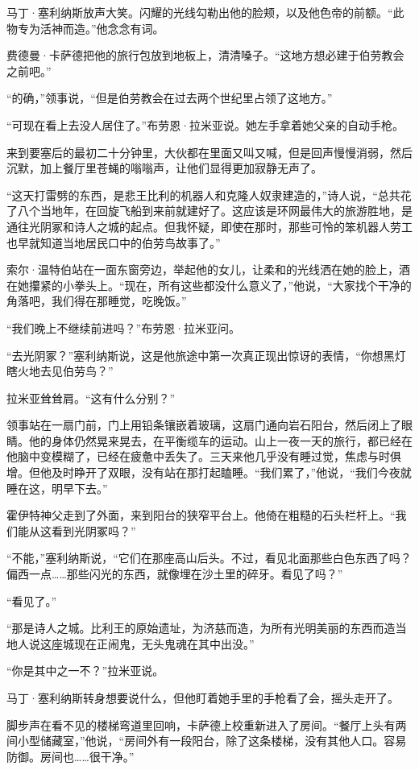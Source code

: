 \documentclass[AutoFakeBold=true]{book}
\begin{document}
马丁·塞利纳斯放声大笑。闪耀的光线勾勒出他的脸颊，以及他色帝的前额。``此物专为活神而造。''他念念有词。

费德曼·卡萨德把他的旅行包放到地板上，清清嗓子。``这地方想必建于伯劳教会之前吧。''

``的确，''领事说，``但是伯劳教会在过去两个世纪里占领了这地方。''

``可现在看上去没人居住了。''布劳恩·拉米亚说。她左手拿着她父亲的自动手枪。

来到要塞后的最初二十分钟里，大伙都在里面又叫又喊，但是回声慢慢消弱，然后沉默，加上餐厅里苍蝇的嗡嗡声，让他们显得更加寂静无声了。

``这天打雷劈的东西，是悲王比利的机器人和克隆人奴隶建造的，''诗人说，``总共花了八个当地年，在回旋飞船到来前就建好了。这应该是环网最伟大的旅游胜地，是通往光阴冢和诗人之城的起点。但我怀疑，即使在那时，那些可怜的笨机器人劳工也早就知道当地居民口中的伯劳鸟故事了。''

索尔·温特伯站在一面东窗旁边，举起他的女儿，让柔和的光线洒在她的脸上，酒在她攥紧的小拳头上。``现在，所有这些都没什么意义了，''他说，``大家找个干净的角落吧，我们得在那睡觉，吃晚饭。''

``我们晚上不继续前进吗？''布劳恩·拉米亚问。

``去光阴冢？''塞利纳斯说，这是他旅途中第一次真正现出惊讶的表情，``你想黑灯瞎火地去见伯劳鸟？''

拉米亚耸耸肩。``这有什么分别？''

领事站在一扇门前，门上用铅条镶嵌着玻璃，这扇门通向岩石阳台，然后闭上了眼睛。他的身体仍然晃来晃去，在平衡缆车的运动。山上一夜一天的旅行，都已经在他脑中变模糊了，已经在疲惫中丢失了。三天来他几乎没有睡过觉，焦虑与时俱增。但他及时睁开了双眼，没有站在那打起瞌睡。``我们累了，''他说，``我们今夜就睡在这，明早下去。''

霍伊特神父走到了外面，来到阳台的狭窄平台上。他倚在粗糙的石头栏杆上。``我们能从这看到光阴冢吗？''

``不能，''塞利纳斯说，``它们在那座高山后头。不过，看见北面那些白色东西了吗？偏西一点……那些闪光的东西，就像埋在沙土里的碎牙。看见了吗？''

``看见了。''

``那是诗人之城。比利王的原始遗址，为济慈而造，为所有光明美丽的东西而造当地人说这座城现在正闹鬼，无头鬼魂在其中出没。''

``你是其中之一不？''拉米亚说。

马丁·塞利纳斯转身想要说什么，但他盯着她手里的手枪看了会，摇头走开了。

脚步声在看不见的楼梯弯道里回响，卡萨德上校重新进入了房间。``餐厅上头有两间小型储藏室，''他说，``房间外有一段阳台，除了这条楼梯，没有其他人口。容易防御。房间也……很干净。''
\end{document}
